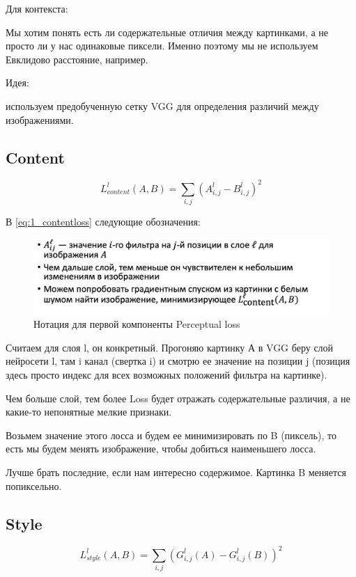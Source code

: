 Для контекста: 
	
	Мы хотим понять есть ли содержательные отличия между картинками, а не просто ли у нас одинаковые пиксели. Именно поэтому мы не используем Евклидово расстояние, например.
	
	Идея: 
	
	используем предобученную сетку VGG для определения различий между изображениями. 
	
	\subsection{Content}
	
	\begin{equation}
	    L^{l}_{content}(A,B) = \sum_{i,j} (A^{l}_{i,j} -B^{l}_{i,j})^{2}
	    \label{eq:1_contentloss}
	\end{equation}
	
    	В  \ref{eq:1_contentloss} следующие обозначения: 
	
	\begin{figure}[H]
\centering
\includegraphics[width=0.7\linewidth]{1_contentnotation.jpg}
\caption{Нотация для первой компоненты Perceptual loss}
\label{fig:1_contentnotation}
\end{figure}
	
	Считаем для слоя l, он конкретный. Прогоняю картинку А в VGG беру слой нейросети l, там i канал (свертка i)  и смотрю ее значение на позиции j (позиция здесь просто индекс для всех возможных положений фильтра на картинке).
	
	Чем больше слой, тем более Loss будет отражать содержательные различия, а не какие-то непонятные мелкие признаки. 
	
	Возьмем значение этого лосса и будем ее минимизировать по B (пиксель), то есть мы будем менять изображение, чтобы добиться наименьшего лосса. 
	
	Лучше брать последние, если нам интересно содержимое. Картинка B меняется попиксельно. 
	
		\subsection{Style}
		
		
			\begin{equation}
	    L^{l}_{style}(A,B) = \sum_{i,j} (G^{l}_{i,j}(A) -G^{l}_{i,j}(B))^{2}
	    \label{eq:1_styletloss}
	\end{equation}
	
